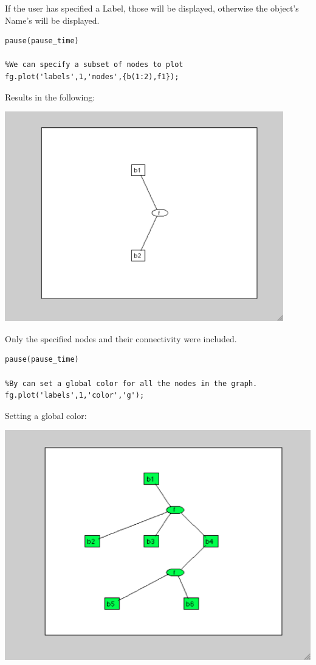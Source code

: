 If the user has specified a Label, those will be displayed, otherwise the object's Name's will be displayed.


\begin{lstlisting}
pause(pause_time)
 
%We can specify a subset of nodes to plot
fg.plot('labels',1,'nodes',{b(1:2),f1});
\end{lstlisting}

Results in the following:



\includegraphics{images/plot3.png}

Only the specified nodes and their connectivity were included.

\begin{lstlisting}
pause(pause_time)
 
%By can set a global color for all the nodes in the graph.
fg.plot('labels',1,'color','g');
\end{lstlisting}

Setting a global color:



\includegraphics{images/plot4.png}

